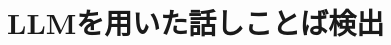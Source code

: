 \chapter{LLMを用いた話しことば検出}

\begin{comment}
書きことばリストは、話しことばチェッカーで検出しない表現をもとに選んでいる。
それでもchatGPTが出力する場合は、チェッカーの癖もあり得る。← これは要相談
\end{comment}